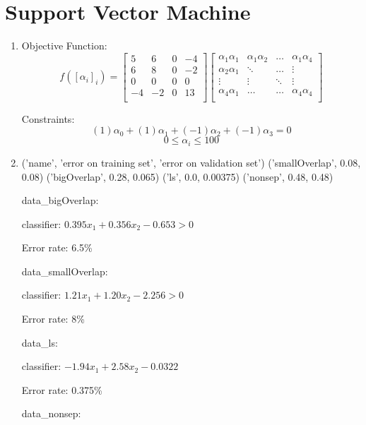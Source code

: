 \documentclass{paper}
\begin{document}
\section{Support Vector Machine}

\begin{enumerate}
    \item

    Objective Function:
    \begin{equation*}
f([\alpha_i]_i) = \begin{bmatrix}
5 & 6 & 0 & -4 \\
6 & 8 & 0 & -2 \\
0 & 0 & 0 & 0 \\
-4 & -2 & 0 & 13 \\
    \end{bmatrix} \begin{bmatrix}
\alpha_1\alpha_1 & \alpha_1\alpha_2 & \hdots & \alpha_1\alpha_4 \\
\alpha_2\alpha_1 & \ddots & \hdots & \vdots \\
\vdots & \vdots & \ddots & \vdots \\
\alpha_4\alpha_1 & \hdots & \hdots & \alpha_4\alpha_4 \\
    \end{bmatrix}
 \end{equation*}

Constraints:
\[
(1)\alpha_0 +
(1)\alpha_1 +
(-1)\alpha_2 +
(-1)\alpha_3 = 0 \]
\[  0 \le \alpha_i \le 100 \]

    \item 
('name', 'error on training set', 'error on validation set')
('smallOverlap', 0.08, 0.08)
('bigOverlap', 0.28, 0.065)
('ls', 0.0, 0.00375)
('nonsep', 0.48, 0.48)
    
data\_bigOverlap:

    classifier: $0.395 x_1 + 0.356 x_2 - 0.653 > 0$

Error rate: 6.5\%



data\_smallOverlap:

classifier:  $1.21 x_1 + 1.20 x_2 - 2.256 > 0$

Error rate: 8\%



data\_ls:

classifier: $-1.94 x_1 + 2.58 x_2 - 0.0322$

Error rate: 0.375\%



data\_nonsep:


\end{enumerate}
\end{document}
